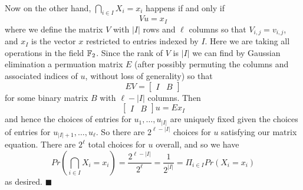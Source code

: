 \documentclass[letterpaper,12pt,oneside,onecolumn]{article}
\begin{document}
\paragraph{}
Now on the other hand, $\bigcap_{i \in I} X_i = x_i$ happens if and only if 
$$ Vu = x_I$$
where we define the matrix $V$ with $|I|$ rows and $\ell$ columns so that $V_{i,j} = v_{i,j}$, and $x_I$ is the vector $x$ restricted to entries indexed by $I$. Here we are taking all operations in the field $\mathbb{F}_2$. Since the rank of $V$ is $|I|$ we can find by Gaussian elimination a permuation matrix $E$ (after possibly permuting the columns and associated indices of $u$, without loss of generality) so that
$$EV = \begin{bmatrix}
I & B
\end{bmatrix}$$
for some binary matrix $B$ with $\ell - |I|$ columns. Then
$$\begin{bmatrix} I & B \end{bmatrix}u = Ex_I$$
and hence the choices of entries for $u_1, \dots, u_{|I|}$ are uniquely fixed given the choices of entries for $u_{|I| + 1}, \dots, u_{\ell}$. So there are $2^{\ell - |I|}$ choices for $u$ satisfying our matrix equation. There are $2^\ell$ total choices for $u$ overall, and so we have
$$Pr(\bigcap_{i \in I} X_i = x_i) = \frac{2^{\ell-|I|}}{2^\ell}  = \frac{1}{2^{|I|}} = \Pi_{i \in I} Pr(X_i = x_i)$$
as desired. $\blacksquare$
\newpage
\section{}

\newpage
\section{}

\newpage
\section{}

\newpage
\section{}
\end{document}
